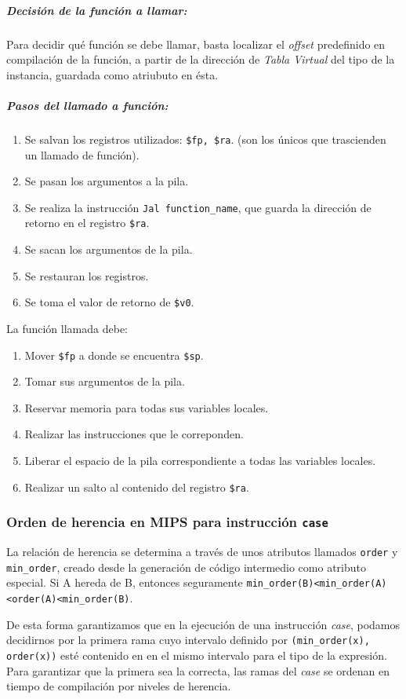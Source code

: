 \documentclass[a4paper,10pt,twocolumn]{article}
\begin{document}
\subparagraph{Decisión de la función a llamar:}
Para decidir qué función se debe llamar, basta localizar el \textit{offset} predefinido en compilación de la función, a partir de la dirección de \textit{Tabla Virtual} del tipo de la instancia, guardada como atriubuto en ésta.


\subparagraph{Pasos del llamado a función:}
		\begin{enumerate}
			\item Se salvan los registros utilizados: \lstinline|$fp, $ra|. (son los únicos que trascienden un llamado de función).
			\item Se pasan los argumentos a la pila.
			\item Se realiza la instrucción \lstinline|Jal function_name|, que guarda la dirección de retorno en el registro \lstinline|$ra|.
			\item Se sacan los argumentos de la pila. 
			\item Se restauran los registros. 
			\item Se toma el valor de retorno de \lstinline|$v0|. 
		\end{enumerate}
	La función llamada debe:
		\begin{enumerate}
			\item Mover \lstinline|$fp| a donde se encuentra \lstinline|$sp|. 
			\item Tomar sus argumentos de la pila. 
			\item Reservar memoria para todas sus variables locales. 
			\item Realizar las instrucciones que le correponden. 
			\item Liberar el espacio de la pila correspondiente a todas las variables locales. 
			\item Realizar un salto al contenido del registro \lstinline|$ra|. 
		\end{enumerate}


\subsubsection{Orden de herencia en MIPS para instrucción \lstinline|case|}
La relación de herencia se determina a través de unos atributos llamados \lstinline|order| y \lstinline|min_order|, creado desde la generación de código intermedio como atributo especial. Si A hereda de B, entonces seguramente \lstinline|min_order(B)<min_order(A)<order(A)<min_order(B)|. 

De esta forma garantizamos que en la ejecución de una instrucción \textit{case}, podamos decidirnos por la primera rama cuyo intervalo definido por \lstinline|(min_order(x), order(x))| esté contenido en en el mismo intervalo para el tipo de la expresión. Para garantizar que la primera sea la correcta, las ramas del \textit{case} se ordenan en tiempo de compilación por niveles de herencia.  
\end{document}
